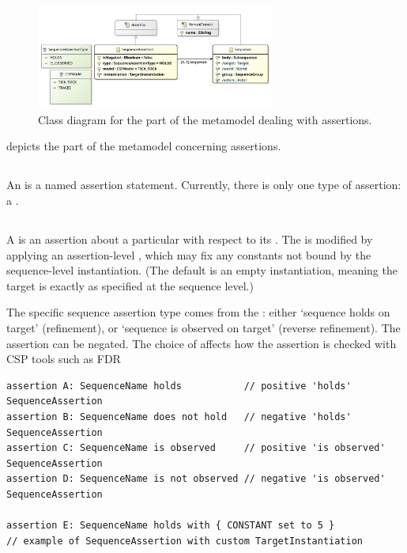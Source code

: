 \begin{figure}
	\centering
	\includegraphics[width=0.7\textwidth]{diagrams/Assertions}
	\caption{Class diagram for the part of the \langname{} metamodel dealing with assertions.}
	\label{fig:metamodel-assertions}
\end{figure}

 depicts the part of the metamodel concerning
assertions.

\subsection{\massertion}

An \massertion{} is a named assertion statement.  Currently, there is
only one type of assertion: a \msequenceassertion{}.  

\subsection{\msequenceassertion}\label{ssec:metamodel-assertions-sequence}

A \msequenceassertion{} is an assertion about a particular \msequence{} with
respect to its \mtarget.  The \mtarget{} is modified by applying an
assertion-level \mtargetinstantiation, which may fix any constants not bound
by the sequence-level instantiation.  (The default is an empty instantiation,
meaning the target is exactly as specified at the sequence level.)

The specific sequence assertion type comes from the \msequenceassertiontype:
either `sequence holds on target' (refinement), or `sequence is observed on
target' (reverse refinement).  The assertion can be negated.  The choice of
\mcspmodel{} affects how the assertion is checked with CSP tools such as FDR

\begin{lstlisting}[style=Example]
assertion A: SequenceName holds           // positive 'holds' SequenceAssertion
assertion B: SequenceName does not hold   // negative 'holds' SequenceAssertion
assertion C: SequenceName is observed     // positive 'is observed' SequenceAssertion
assertion D: SequenceName is not observed // negative 'is observed' SequenceAssertion

assertion E: SequenceName holds with { CONSTANT set to 5 }
// example of SequenceAssertion with custom TargetInstantiation
\end{lstlisting}

